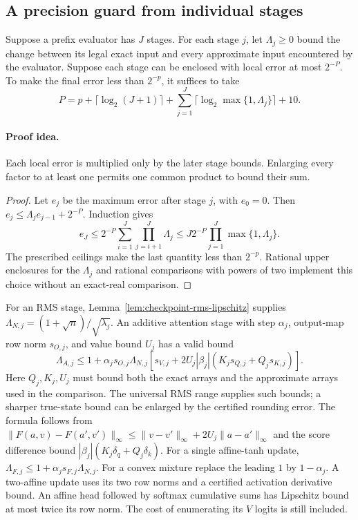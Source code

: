 \subsection{A precision guard from individual stages}

\begin{lemma}
\label{lem:checkpoint-precision}
Suppose a prefix evaluator has $J$ stages. For each stage $j$,
let $\Lambda_j\ge0$ bound the change between its legal exact input
and every approximate input encountered by the evaluator.
Suppose each stage can be enclosed with local error at most
$2^{-P}$. To make the final error less than $2^{-p}$, it suffices
to take
\[
 P=p+\lceil\log_2(J+1)\rceil
     +\sum_{j=1}^J
          \lceil\log_2\max\{1,\Lambda_j\}\rceil+10.
\]
\end{lemma}

\paragraph{Proof idea.}
Each local error is multiplied only by the later stage bounds.
Enlarging every factor to at least one permits one common
product to bound their sum.

\begin{proof}
Let $e_j$ be the maximum error after stage $j$, with $e_0=0$.
Then $e_j\le\Lambda_je_{j-1}+2^{-P}$. Induction gives
\[
 e_J\le2^{-P}\sum_{i=1}^J\prod_{j=i+1}^J\Lambda_j
     \le J2^{-P}\prod_{j=1}^J\max\{1,\Lambda_j\}.
\]
The prescribed ceilings make the last quantity less than
$2^{-p}$. Rational upper enclosures for the $\Lambda_j$ and
rational comparisons with powers of two implement this choice
without an exact-real comparison.
\end{proof}

For an RMS stage, Lemma~\ref{lem:checkpoint-rms-lipschitz} supplies
$\Lambda_{N,j}=(1+\sqrt n)/\sqrt{\lambda_j}$.
An additive attention stage with step $\alpha_j$, output-map row
norm $s_{O,j}$, and value bound $U_j$ has a valid bound
\[
 \Lambda_{A,j}\le
 1+\alpha_js_{O,j}\Lambda_{N,j}
   [s_{V,j}+2U_j|\beta_j|
             (K_js_{Q,j}+Q_js_{K,j})].
\]
Here $Q_j,K_j,U_j$ must bound both the exact arrays and the
approximate arrays used in the comparison. The universal RMS
range supplies such bounds; a sharper true-state bound can be
enlarged by the certified rounding error.
The formula follows from
$\|F(a,v)-F(a',v')\|_\infty
\le\|v-v'\|_\infty+2U_j\|a-a'\|_\infty$
and the score difference bound
$|\beta_j|(K_j\delta_q+Q_j\delta_k)$.
For a single affine-tanh update,
$\Lambda_{F,j}\le1+\alpha_js_{F,j}\Lambda_{N,j}$.
For a convex mixture replace the leading $1$ by $1-\alpha_j$.
A two-affine update uses its two row norms and a certified
activation derivative bound. An affine head followed by softmax
cumulative sums has Lipschitz bound at most twice its row norm.
The cost of enumerating its $V$ logits is still included.

